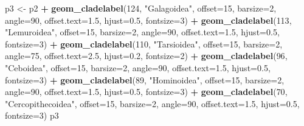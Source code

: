 \documentclass[
]{book}
\newenvironment{Shaded}{\begin{snugshade}}{\end{snugshade}}
\newcommand{\DataTypeTok}[1]{\textcolor[rgb]{0.13,0.29,0.53}{#1}}
\newcommand{\DecValTok}[1]{\textcolor[rgb]{0.00,0.00,0.81}{#1}}
\newcommand{\FloatTok}[1]{\textcolor[rgb]{0.00,0.00,0.81}{#1}}
\newcommand{\KeywordTok}[1]{\textcolor[rgb]{0.13,0.29,0.53}{\textbf{#1}}}
\newcommand{\NormalTok}[1]{#1}
\newcommand{\OperatorTok}[1]{\textcolor[rgb]{0.81,0.36,0.00}{\textbf{#1}}}
\newcommand{\StringTok}[1]{\textcolor[rgb]{0.31,0.60,0.02}{#1}}
\begin{document}
\begin{Shaded}
\begin{Highlighting}[]
\NormalTok{p3 \textless{}{-}}\StringTok{ }\NormalTok{p2 }\OperatorTok{+}
\StringTok{  }\KeywordTok{geom\_cladelabel}\NormalTok{(}\DecValTok{124}\NormalTok{, }\StringTok{"Galagoidea"}\NormalTok{, }\DataTypeTok{offset=}\DecValTok{15}\NormalTok{, }\DataTypeTok{barsize=}\DecValTok{2}\NormalTok{, }\DataTypeTok{angle=}\DecValTok{90}\NormalTok{,}
                  \DataTypeTok{offset.text=}\FloatTok{1.5}\NormalTok{, }\DataTypeTok{hjust=}\FloatTok{0.5}\NormalTok{, }\DataTypeTok{fontsize=}\DecValTok{3}\NormalTok{) }\OperatorTok{+}\StringTok{ }
\StringTok{  }\KeywordTok{geom\_cladelabel}\NormalTok{(}\DecValTok{113}\NormalTok{, }\StringTok{"Lemuroidea"}\NormalTok{, }\DataTypeTok{offset=}\DecValTok{15}\NormalTok{, }\DataTypeTok{barsize=}\DecValTok{2}\NormalTok{, }\DataTypeTok{angle=}\DecValTok{90}\NormalTok{,}
                  \DataTypeTok{offset.text=}\FloatTok{1.5}\NormalTok{, }\DataTypeTok{hjust=}\FloatTok{0.5}\NormalTok{, }\DataTypeTok{fontsize=}\DecValTok{3}\NormalTok{) }\OperatorTok{+}
\StringTok{  }\KeywordTok{geom\_cladelabel}\NormalTok{(}\DecValTok{110}\NormalTok{, }\StringTok{"Tarsioidea"}\NormalTok{, }\DataTypeTok{offset=}\DecValTok{15}\NormalTok{, }\DataTypeTok{barsize=}\DecValTok{2}\NormalTok{, }\DataTypeTok{angle=}\DecValTok{75}\NormalTok{,}
                  \DataTypeTok{offset.text=}\FloatTok{2.5}\NormalTok{, }\DataTypeTok{hjust=}\FloatTok{0.2}\NormalTok{, }\DataTypeTok{fontsize=}\DecValTok{2}\NormalTok{) }\OperatorTok{+}
\StringTok{  }\KeywordTok{geom\_cladelabel}\NormalTok{(}\DecValTok{96}\NormalTok{, }\StringTok{"Ceboidea"}\NormalTok{, }\DataTypeTok{offset=}\DecValTok{15}\NormalTok{, }\DataTypeTok{barsize=}\DecValTok{2}\NormalTok{, }\DataTypeTok{angle=}\DecValTok{90}\NormalTok{,}
                  \DataTypeTok{offset.text=}\FloatTok{1.5}\NormalTok{, }\DataTypeTok{hjust=}\FloatTok{0.5}\NormalTok{, }\DataTypeTok{fontsize=}\DecValTok{3}\NormalTok{) }\OperatorTok{+}
\StringTok{  }\KeywordTok{geom\_cladelabel}\NormalTok{(}\DecValTok{89}\NormalTok{, }\StringTok{"Hominoidea"}\NormalTok{, }\DataTypeTok{offset=}\DecValTok{15}\NormalTok{, }\DataTypeTok{barsize=}\DecValTok{2}\NormalTok{, }\DataTypeTok{angle=}\DecValTok{90}\NormalTok{,}
                  \DataTypeTok{offset.text=}\FloatTok{1.5}\NormalTok{, }\DataTypeTok{hjust=}\FloatTok{0.5}\NormalTok{, }\DataTypeTok{fontsize=}\DecValTok{3}\NormalTok{) }\OperatorTok{+}
\StringTok{  }\KeywordTok{geom\_cladelabel}\NormalTok{(}\DecValTok{70}\NormalTok{, }\StringTok{"Cercopithecoidea"}\NormalTok{, }\DataTypeTok{offset=}\DecValTok{15}\NormalTok{, }\DataTypeTok{barsize=}\DecValTok{2}\NormalTok{, }\DataTypeTok{angle=}\DecValTok{90}\NormalTok{,}
                  \DataTypeTok{offset.text=}\FloatTok{1.5}\NormalTok{, }\DataTypeTok{hjust=}\FloatTok{0.5}\NormalTok{, }\DataTypeTok{fontsize=}\DecValTok{3}\NormalTok{)}
\NormalTok{p3}
\end{Highlighting}
\end{Shaded}
\end{document}
